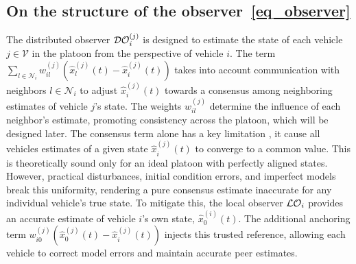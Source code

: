 \subsection{On the structure of the observer~\eqref{eq_observer}}
\vspace*{-0.3cm}
%
The distributed observer $\mathcal{DO}_i^{(j)}$ is designed to estimate the state of each vehicle $j \in \mathcal{V}$ in the platoon from the perspective of vehicle $i$. 
The term $\sum_{l \in {\mathcal{N}}_i} w_{il}^{(j)} \left( \hat{x}_l^{(j)}(t) - \hat{x}_i^{(j)}(t) \right)$ takes into account communication with neighbors $l \in {\mathcal{N}}_i$ to adjust $\hat{x}_i^{(j)}(t)$ towards a consensus among neighboring estimates of vehicle $j$'s state. The weights $w_{il}^{(j)}$ determine the influence of each neighbor's estimate, promoting consistency across the platoon, which will be designed later. The consensus term alone has a key limitation , it cause all vehicles estimates of a given state $\hat{x}_i^{(j)}(t)$ to converge to a common value. This is theoretically sound only for an ideal platoon with perfectly aligned states. However, practical disturbances, initial condition errors, and imperfect models break this uniformity, rendering a pure consensus estimate inaccurate for any individual vehicle's true state. To mitigate this, the local observer $\mathcal{LO}_i$ provides an accurate estimate of vehicle $i$'s own state, $\hat{x}_0^{(i)}(t)$. The additional anchoring term $w_{i0}^{(j)} \left( \hat{x}_0^{(j)}(t) - \hat{x}_i^{(j)}(t) \right)$ injects this trusted reference, allowing each vehicle to correct model errors and maintain accurate peer estimates.




